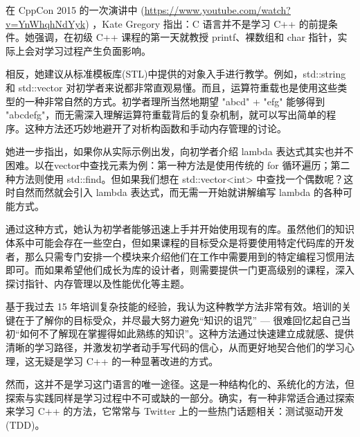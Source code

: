 在 CppCon 2015 的一次演讲中 (\url{https://www.youtube.com/watch?v=YnWhqhNdYyk}) ，Kate Gregory 指出：C 语言并不是学习 C++ 的前提条件。她强调，在初级 C++ 课程的第一天就教授 printf、裸数组和 char 指针，实际上会对学习过程产生负面影响。

相反，她建议从标准模板库(STL)中提供的对象入手进行教学。例如，std::string 和 std::vector 对初学者来说都非常直观易懂。而且，运算符重载也是使用这些类型的一种非常自然的方式。初学者理所当然地期望 "abcd" + "efg" 能够得到 "abcdefg"，而无需深入理解运算符重载背后的复杂机制，就可以写出简单的程序。这种方法还巧妙地避开了对析构函数和手动内存管理的讨论。

她进一步指出，如果你从实际示例出发，向初学者介绍 lambda 表达式其实也并不困难。以在vector中查找元素为例：第一种方法是使用传统的 for 循环遍历；第二种方法则使用 std::find。但如果我们想在 std::vector<int> 中查找一个偶数呢？这时自然而然就会引入 lambda 表达式，而无需一开始就讲解编写 lambda 的各种可能方式。

通过这种方式，她认为初学者能够迅速上手并开始使用现有的库。虽然他们的知识体系中可能会存在一些空白，但如果课程的目标受众是将要使用特定代码库的开发者，那么只需专门安排一个模块来介绍他们在工作中需要用到的特定编程习惯用法即可。而如果希望他们成长为库的设计者，则需要提供一门更高级别的课程，深入探讨指针、内存管理以及性能优化等主题。

基于我过去 15 年培训复杂技能的经验，我认为这种教学方法非常有效。培训的关键在于了解你的目标受众，并尽最大努力避免“知识的诅咒” --- 很难回忆起自己当初“如何不了解现在掌握得如此熟练的知识”。这种方法通过快速建立成就感、提供清晰的学习路径，并激发初学者动手写代码的信心，从而更好地契合他们的学习心理，这无疑是学习 C++ 的一种显著改进的方式。

然而，这并不是学习这门语言的唯一途径。这是一种结构化的、系统化的方法，但探索与实践同样是学习过程中不可或缺的一部分。确实，有一种非常适合通过探索来学习 C++ 的方法，它常常与 Twitter 上的一些热门话题相关：测试驱动开发(TDD)。